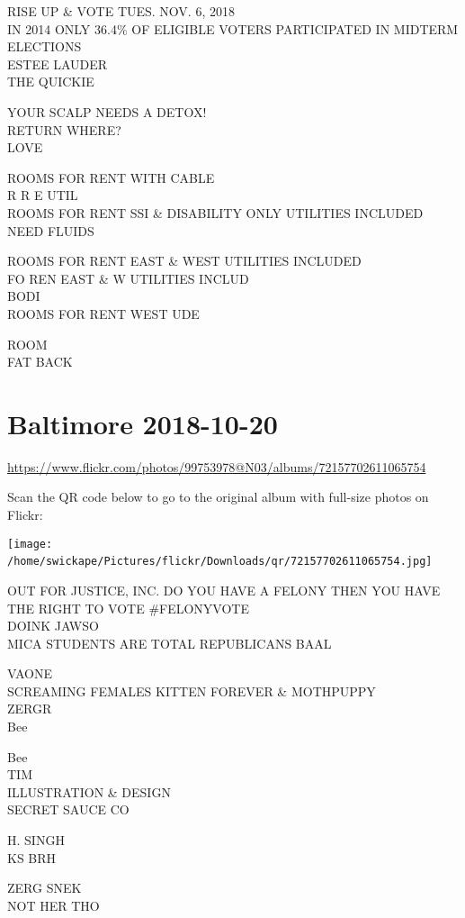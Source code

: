 \documentclass[10pt,letterpaper]{article}
\begin{document}
RISE UP \& VOTE TUES. NOV. 6, 2018\\
IN 2014 ONLY 36.4\% OF ELIGIBLE VOTERS PARTICIPATED IN MIDTERM ELECTIONS\\
ESTEE LAUDER\\
THE QUICKIE

YOUR SCALP NEEDS A DETOX!\\
RETURN WHERE?\\
LOVE

ROOMS FOR RENT WITH CABLE\\
R R E UTIL\\
ROOMS FOR RENT SSI \& DISABILITY ONLY UTILITIES INCLUDED\\
NEED FLUIDS

ROOMS FOR RENT EAST \& WEST UTILITIES INCLUDED\\
FO REN EAST \& W UTILITIES INCLUD\\
BODI\\
ROOMS FOR RENT WEST UDE

ROOM\\
FAT BACK
\

\section*{Baltimore 2018-10-20}

\url{https://www.flickr.com/photos/99753978@N03/albums/72157702611065754}

Scan the QR code below to go to the original album with full-size photos on Flickr:

\texttt{[image: /home/swickape/Pictures/flickr/Downloads/qr/72157702611065754.jpg]}
\

OUT FOR JUSTICE, INC. DO YOU HAVE A FELONY THEN YOU HAVE THE RIGHT TO VOTE \#FELONYVOTE\\
DOINK JAWSO\\
MICA STUDENTS ARE TOTAL REPUBLICANS BAAL

VAONE\\
SCREAMING FEMALES KITTEN FOREVER \& MOTHPUPPY\\
ZERGR\\
Bee

Bee\\
TIM\\
ILLUSTRATION \& DESIGN\\
SECRET SAUCE CO

H. SINGH\\
KS BRH

ZERG SNEK\\
NOT HER THO
\end{document}
